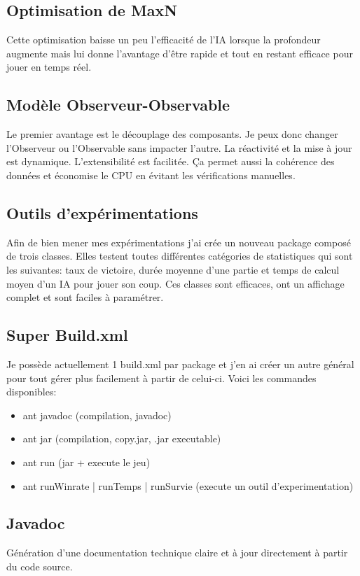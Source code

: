 \documentclass[a4paper,12pt]{article}
\begin{document}
\subsection{Optimisation de MaxN}
Cette optimisation baisse un peu l'efficacité de l'IA lorsque la profondeur augmente mais lui donne l'avantage d’être rapide et tout en restant efficace pour jouer en temps réel.

\subsection{Modèle Observeur-Observable}
Le premier avantage est le découplage des composants. Je peux donc changer l'Observeur ou l'Observable sans impacter l'autre.
La réactivité et la mise à jour est dynamique. L'extensibilité est facilitée. Ça permet aussi la cohérence des données et économise le CPU en évitant les vérifications manuelles.

\subsection{Outils d’expérimentations}
Afin de bien mener mes expérimentations j'ai crée un nouveau package composé de trois classes. Elles testent toutes différentes catégories de statistiques qui sont les suivantes: taux de victoire, durée moyenne d'une partie et temps de calcul moyen d'un IA pour jouer son coup.
Ces classes sont efficaces, ont un affichage complet et sont faciles à paramétrer.

\subsection{Super Build.xml}
Je possède actuellement 1 build.xml par package et j'en ai créer un autre général pour tout gérer plus facilement à partir de celui-ci.
Voici les commandes disponibles:
\begin{itemize}
\item ant javadoc (compilation, javadoc)
\item ant jar (compilation, copy.jar, .jar executable)
\item ant run (jar + execute le jeu)
\item ant runWinrate | runTemps | runSurvie (execute un outil d'experimentation)
\end{itemize}

\subsection{Javadoc}
Génération d'une documentation technique claire et à jour directement à partir du code source.
\end{document}
